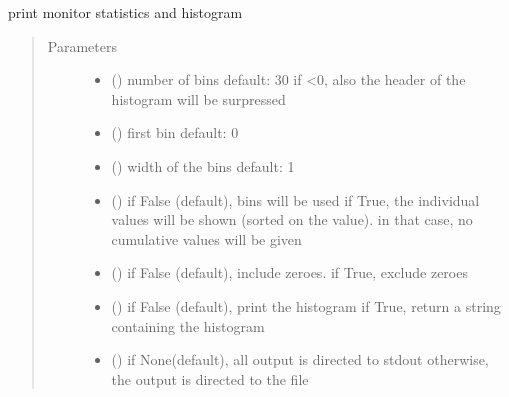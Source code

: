 \documentclass[letterpaper,10pt,english]{sphinxmanual}
\begin{document}
\begin{fulllineitems}
\begin{fulllineitems}
\end{fulllineitems}


\begin{fulllineitems}
\label{\detokenize{Reference:salabim.Monitor.print_histograms}}
print monitor statistics and histogram
\begin{quote}\begin{description}
\item[{Parameters}] \leavevmode\begin{itemize}
\item {} 
 () \textendash{} number of bins 
default: 30 
if \textless{}0, also the header of the histogram will be surpressed

\item {} 
 () \textendash{} first bin 
default: 0

\item {} 
 () \textendash{} width of the bins 
default: 1

\item {} 
 () \textendash{} if False (default), bins will be used 
if True, the individual values will be shown (sorted on the value).
in that case, no cumulative values will be given 

\item {} 
 () \textendash{} if False (default), include zeroes. if True, exclude zeroes

\item {} 
 () \textendash{} if False (default), print the histogram
if True, return a string containing the histogram

\item {} 
 () \textendash{} if None(default), all output is directed to stdout 
otherwise, the output is directed to the file


\end{itemize}
\end{description}
\end{quote}
\end{fulllineitems}
\end{fulllineitems}
\end{document}
